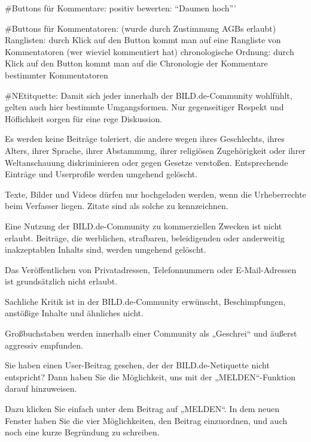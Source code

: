 #Buttons für Kommentare: 
	positiv bewerten: ``Daumen hoch'''
	
	

#Buttons für Kommentatoren:  (wurde durch Zustimmung AGBs erlaubt)
	Ranglisten: durch Klick auf den Button kommt man auf eine Rangliste von Kommentatoren (wer wieviel kommentiert hat)
	chronologische Ordnung: durch Klick auf den Button kommt man auf die Chronologie der Kommentare bestimmter Kommentatoren

#NEtitquette:
Damit sich jeder innerhalb der BILD.de-Community wohlfühlt, gelten auch hier bestimmte Umgangsformen. Nur gegenseitiger Respekt und Höflichkeit sorgen für eine rege Diskussion.

Es werden keine Beiträge toleriert, die andere wegen ihres Geschlechts, ihres Alters, ihrer Sprache, ihrer Abstammung, ihrer religiösen Zugehörigkeit oder ihrer Weltanschauung diskriminieren oder gegen Gesetze verstoßen. Entsprechende Einträge und Userprofile werden umgehend gelöscht.

Texte, Bilder und Videos dürfen nur hochgeladen werden, wenn die Urheberrechte beim Verfasser liegen. Zitate sind als solche zu kennzeichnen.

Eine Nutzung der BILD.de-Community zu kommerziellen Zwecken ist nicht erlaubt. Beiträge, die werblichen, strafbaren, beleidigenden oder anderweitig inakzeptablen Inhalts sind, werden umgehend gelöscht.

Das Veröffentlichen von Privatadressen, Telefonnummern oder E-Mail-Adressen ist grundsätzlich nicht erlaubt.

Sachliche Kritik ist in der BILD.de-Community erwünscht, Beschimpfungen, anstößige Inhalte und ähnliches nicht.

Großbuchstaben werden innerhalb einer Community als „Geschrei“ und äußerst aggressiv empfunden.

Sie haben einen User-Beitrag gesehen, der der BILD.de-Netiquette nicht entspricht? Dann haben Sie die Möglichkeit, uns mit der „MELDEN“-Funktion darauf hinzuweisen.

Dazu klicken Sie einfach unter dem Beitrag auf „MELDEN“. In dem neuen Fenster haben Sie die vier Möglichkeiten, den Beitrag einzuordnen, und auch noch eine kurze Begründung zu schreiben.
